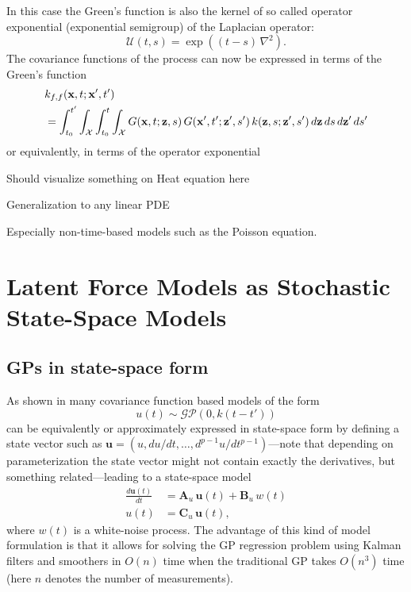 \documentclass[journal]{IEEEtran}
\newcommand{\simo}[1]{{\color{red}#1}}
\begin{document}
In this case the Green's function is also the kernel of so called operator exponential (exponential semigroup) of the Laplacian operator:
%
\begin{equation}
  \mathcal{U}(t, s) = \exp\left( (t-s) \, \nabla^2 \right).
\end{equation}
%
The covariance functions of the process can now be expressed in terms of the Green's function
%
\begin{equation}
\begin{split}
  &k_{f,f}(\mathbf{x}, t; \mathbf{x}', t') \\
  &=
  \int_{t_0}^{t'} \int_{\mathcal{X}} \int_{t_0}^{t}  \int_{\mathcal{X}}
  G(\mathbf{x}, t; \mathbf{z}, s) \, G(\mathbf{x}', t'; \mathbf{z}', s') \,
  k(\mathbf{z}, s; \mathbf{z}', s') \, d\mathbf{z} \, ds \, d\mathbf{z}' \, ds'
\end{split}
\notag
\end{equation}
%
or equivalently, in terms of the operator exponential
%


\simo{Should visualize something on Heat equation here}

\simo{Generalization to any linear PDE}

\simo{Especially non-time-based models such as the Poisson equation.}

\section{Latent Force Models as Stochastic State-Space Models}

\subsection{GPs in state-space form}
As shown in \cite{Hartikainen+Sarkka:2010,Sarkka+Solin+Hartikainen:2013,Sarkka+Piche:2014} many covariance function based models of the form
%
\begin{equation}
  u(t) \sim \mathcal{GP}(0,k(t - t'))
\end{equation}
%
can be equivalently or approximately expressed in state-space form by defining a state vector such as $\mathbf{u} = (u, du/dt,\ldots,d^{p-1}u/dt^{p-1})$---note that depending on parameterization the state vector might not contain exactly the derivatives, but something related---leading to a state-space model
%
\begin{equation}
\begin{split}
  \frac{d\mathbf{u}(t)}{dt}
  &= \mathbf{A}_u \, \mathbf{u}(t) + \mathbf{B}_u \, w(t) \\
  u(t) &= \mathbf{C}_u \, \mathbf{u}(t),
\end{split}
\label{eq:ssu}
\end{equation}
%
where $w(t)$ is a white-noise process. The advantage of this kind of model formulation is that it allows for solving the GP regression problem using Kalman filters and smoothers \cite{Sarkka:2013} in $O(n)$ time when the traditional GP takes $O(n^3)$ time (here $n$ denotes the number of measurements).
\end{document}
